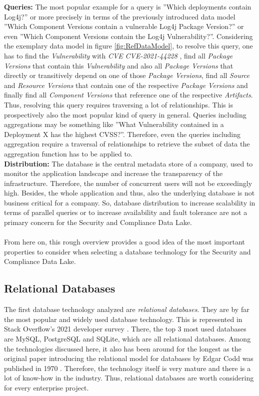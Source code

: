 \textbf{Queries:} The most popular example for a query is ''Which deployments contain Log4j?'' or more precisely in terms of the previously introduced data model ''Which Component Versions contain a vulnerable Log4j Package Version?'' or even ''Which Component Versions contain the Log4j Vulnerability?''. Considering the exemplary data model in figure \ref{fig:RefDataModel}, to resolve this query, one has to find the \emph{Vulnerability} with \emph{CVE} \textit{CVE-2021-44228} \cite{Log4jVuln}, find all \emph{Package Versions} that contain this \emph{Vulnerability} and also all \emph{Package Versions} that directly or transitively depend on one of those \emph{Package Versions}, find all \emph{Source} and \emph{Resource Versions} that contain one of the respective \emph{Package Versions} and finally find all \emph{Component Versions} that reference one of the respective \emph{Artifacts}. Thus, resolving this query requires traversing a lot of relationships. This is prospectively also the most popular kind of query in general. Queries including aggregations may be something like ''What Vulnerability contained in a Deployment X has the highest CVSS?''. Therefore, even the queries including aggregation require a traversal of relationships to retrieve the subset of data the aggregation function has to be applied to.\\
\textbf{Distribution:} The database is the central metadata store of a company, used to monitor the application landscape and increase the transparency of the infrastructure. Therefore, the number of concurrent users will not be exceedingly high. Besides, the whole application and thus, also the underlying database is not business critical for a company. So, database distribution to increase scalability in terms of parallel queries or to increase availability and fault tolerance are not a primary concern for the Security and Compliance Data Lake.\\\\
From here on, this rough overview provides a good idea of the most important properties to consider when selecting a database technology for the Security and Compliance Data Lake. 


\subsection{Relational Databases}
The first database technology analyzed are \textit{relational databases}. They are by far the most popular and widely used database technology. This is represented in Stack Overflow's 2021 developer survey \cite{StackoverflowDeveloperSurvey}. There, the top 3 most used databases are MySQL, PostgreSQL and SQLite, which are all relational databases. Among the technologies discussed here, it also has been around for the longest as the original paper introducing the relational model for databases by Edgar Codd was published in 1970 \cite{RelationalDatabaseOriginalPaper}. Therefore, the technology itself is very mature and there is a lot of know-how in the industry. Thus, relational databases are worth considering for every enterprise project.

